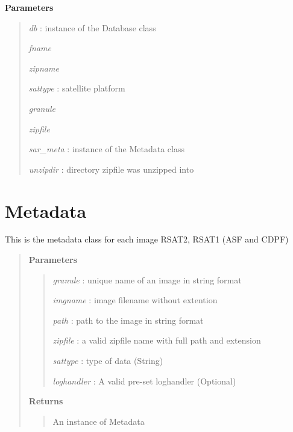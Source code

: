 \documentclass[letterpaper,10pt,openany,oneside]{sphinxmanual}
\begin{document}
\begin{fulllineitems}
\begin{fulllineitems}
\begin{description}
\end{description}

\textbf{Parameters}
\begin{quote}

\emph{db}       : instance of the Database class

\emph{fname}

\emph{zipname}

\emph{sattype}  : satellite platform

\emph{granule}

\emph{zipfile}

\emph{sar\_meta} : instance of the Metadata class

\emph{unzipdir} : directory zipfile was unzipped into
\end{quote}

\end{fulllineitems}


\end{fulllineitems}



\section{Metadata}
\label{code:metadata}

\begin{fulllineitems}
\label{code:SigLib.Metadata}
This is the metadata class for each image RSAT2, RSAT1 (ASF and CDPF)
\begin{quote}

\textbf{Parameters}
\begin{quote}

\emph{granule} : unique name of an image in string format

\emph{imgname} : image filename without extention

\emph{path} : path to the image in string format

\emph{zipfile} : a valid zipfile name with full path and extension

\emph{sattype}    : type of data (String)

\emph{loghandler} : A valid pre-set loghandler (Optional)
\end{quote}

\textbf{Returns}
\begin{quote}

An instance of Metadata
\end{quote}
\end{quote}

\end{fulllineitems}
\end{document}
